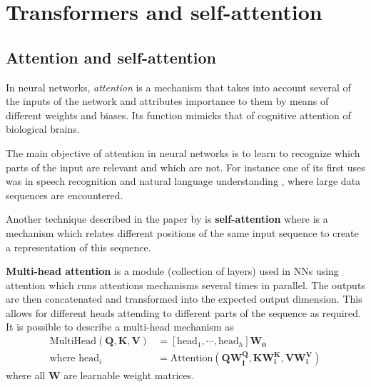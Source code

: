 \chapter{Transformers and self-attention}\label{sec:transformers}

\section{Attention and self-attention}\label{Attention}

In neural networks, \textit{attention}\cite{article:attention} is a mechanism
that takes into account several of the inputs of the network
and attributes importance to them by means of different weights
and biases. Its function mimicks that of cognitive attention of
biological brains.

The main objective of attention in neural networks is to learn
to recognize which parts of the input are relevant and which are not.
For instance one of its first uses was in speech recognition and
natural language understanding \cite{bahdanau2014neural}, where
large data sequences are encountered.

Another technique described in the paper by \citet{article:attention}
is \textbf{self-attention} where is a mechanism which relates different positions
of the same input sequence to create a representation of this sequence.

\textbf{Multi-head attention} is a module (collection of layers) used
in NNs using attention which runs attentions mechanisms several times
in parallel. The outputs are then concatenated and transformed into the
expected output dimension. This allows for different heads attending
to different parts of the sequence as required. It is possible to describe
a multi-head mechanism as
\begin{equation*}
  \begin{split}
    \text{MultiHead}(\bm{Q, K, V}) &= [\text{head}_1, \cdots, \text{head}_h]\bm{W_0} \\
    \text{where head}_i &=\text{Attention}(\bm{QW_I^Q, KW_i^K, VW_i^V})
  \end{split}
\end{equation*}
where all $\bm{W}$ are learnable weight matrices\cite{article:attention}.

